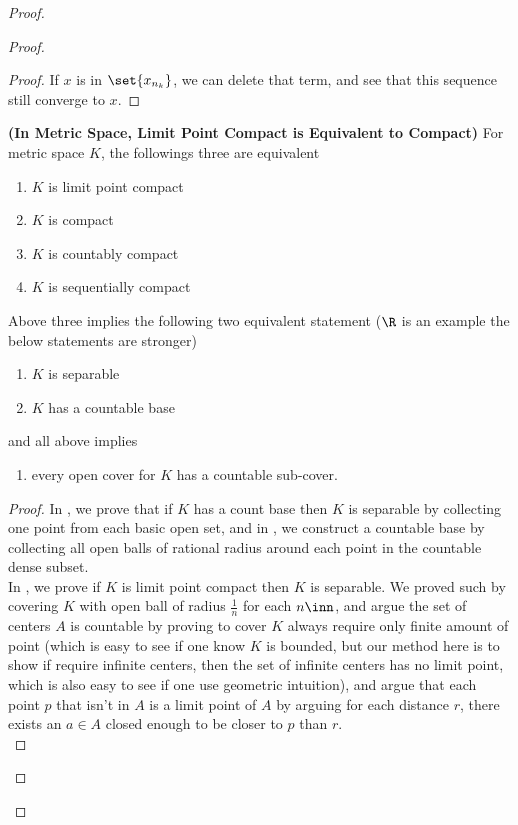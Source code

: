 \documentclass{report}
\begin{document}
\begin{proof}
\begin{proof}
\begin{proof}
If $x$ is in $\set{x_{n_k}}$, we can delete that term, and see that this sequence still converge to $x$.
\end{proof}
\begin{theorem}
\label{3.6.7}
\textbf{(In Metric Space, Limit Point Compact is Equivalent to Compact)} For metric space $K$, the followings three are equivalent
\begin{enumerate}[label=(\alph*)]
  \item $K$ is limit point compact 
  \item $K$ is compact 
  \item $K$ is countably compact 
  \item $K$ is sequentially compact
\end{enumerate}
Above three implies the following two equivalent statement ($\R$ is an example the below statements are stronger)
\begin{enumerate}[label=(\arabic*)]
  \item $K$ is separable
  \item $K$ has a countable base
\end{enumerate}
and all above implies
\begin{enumerate}[label=(\roman*)]
  \item every open cover for $K$ has a countable sub-cover.
\end{enumerate}
\end{theorem}
\begin{proof}
In , we prove that if $K$ has a count base then $K$ is separable by collecting one point from each basic open set, and in , we construct a countable base by collecting all open balls of rational radius around each point in the countable dense subset.\\

In , we prove if $K$ is limit point compact then  $K$ is separable. We proved such by covering $K$ with open ball of radius $\frac{1}{n}$ for each $n\inn$, and argue the set of centers $A$ is countable by proving to cover $K$ always require only finite amount of point (which is easy to see if one know $K$ is bounded, but our method here is to show if require infinite centers, then the set of infinite centers has no limit point, which is also easy to see if one use geometric intuition), and argue that each point $p$ that isn't in $A$ is a limit point of $A$ by arguing for each distance $r$, there exists an  $a\in A$ closed enough to be closer to $p$ than $r$.\\


\end{proof}
\end{proof}
\end{proof}
\end{document}
